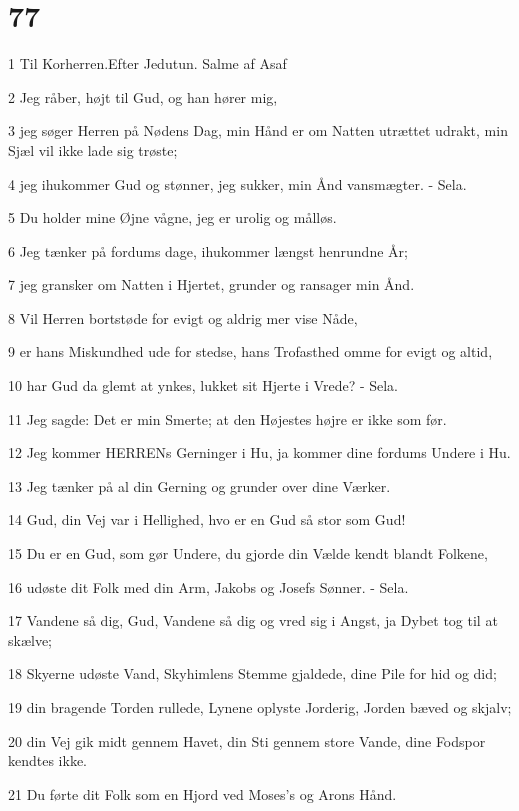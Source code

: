 \chapter{77}

\par 1 Til Korherren.Efter Jedutun. Salme af Asaf
\par 2 Jeg råber, højt til Gud, og han hører mig,
\par 3 jeg søger Herren på Nødens Dag, min Hånd er om Natten utrættet udrakt, min Sjæl vil ikke lade sig trøste;
\par 4 jeg ihukommer Gud og stønner, jeg sukker, min Ånd vansmægter. - Sela.
\par 5 Du holder mine Øjne vågne, jeg er urolig og målløs.
\par 6 Jeg tænker på fordums dage, ihukommer længst henrundne År;
\par 7 jeg gransker om Natten i Hjertet, grunder og ransager min Ånd.
\par 8 Vil Herren bortstøde for evigt og aldrig mer vise Nåde,
\par 9 er hans Miskundhed ude for stedse, hans Trofasthed omme for evigt og altid,
\par 10 har Gud da glemt at ynkes, lukket sit Hjerte i Vrede? - Sela.
\par 11 Jeg sagde: Det er min Smerte; at den Højestes højre er ikke som før.
\par 12 Jeg kommer HERRENs Gerninger i Hu, ja kommer dine fordums Undere i Hu.
\par 13 Jeg tænker på al din Gerning og grunder over dine Værker.
\par 14 Gud, din Vej var i Hellighed, hvo er en Gud så stor som Gud!
\par 15 Du er en Gud, som gør Undere, du gjorde din Vælde kendt blandt Folkene,
\par 16 udøste dit Folk med din Arm, Jakobs og Josefs Sønner. - Sela.
\par 17 Vandene så dig, Gud, Vandene så dig og vred sig i Angst, ja Dybet tog til at skælve;
\par 18 Skyerne udøste Vand, Skyhimlens Stemme gjaldede, dine Pile for hid og did;
\par 19 din bragende Torden rullede, Lynene oplyste Jorderig, Jorden bæved og skjalv;
\par 20 din Vej gik midt gennem Havet, din Sti gennem store Vande, dine Fodspor kendtes ikke.
\par 21 Du førte dit Folk som en Hjord ved Moses's og Arons Hånd.


